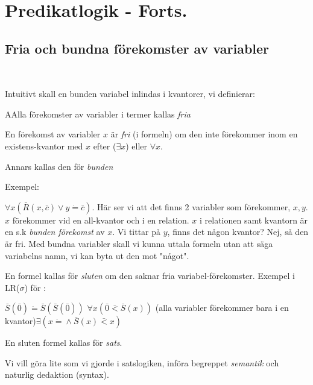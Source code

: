 \section{Predikatlogik - Forts.}
\par\bigskip
\subsection{Fria och bundna förekomster av variabler}\hfill\\
\par\bigskip
\noindent Intuitivt skall en bunden variabel inlindas i kvantorer, vi definierar:
\par\bigskip
\begin{theo}
  AAlla förekomster av variabler i termer kallas \textit{fria}
  \par\bigskip
  \noindent En förekomst av variabler $x$ är \textit{fri} (i formeln) om den inte förekommer inom en existens-kvantor med $x$ efter ($\exists x$) eller $\forall x$.\par
  \noindent Annars kallas den för \textit{bunden}
\end{theo}
\par\bigskip
\noindent Exempel:\par
\noindent $\forall x\left(\bar{R}(x,\bar{c})\vee y\dot{=}\bar{c}\right)$. Här ser vi att det finns 2 variabler som  förekommer, $x,y$. $x$ förekommer vid en all-kvantor och i en relation. $x$ i relationen samt kvantorn är en s.k \textit{bunden förekomst} av $x$. Vi tittar på $y$, finns det någon kvantor? Nej, så den är fri. Med bundna variabler skall vi kunna uttala formeln utan att säga variabelns namn, vi kan byta ut den mot "något".
\par\bigskip
\noindent En formel kallas för \textit{sluten} om den saknar fria variabel-förekomster. Exempel i LR($\sigma$) för :
\par\bigskip $\bar{S}(\bar{0})\dot{=}\bar{S}(\bar{S}(\bar{0}))$ \qquad $\forall x\left(\bar{0}\bar{<}\bar{S}(x)\right)$ (alla variabler förekommer bara i en kvantor)\qquad$\exists\left(x\dot{=}\wedge\bar{S}(x)\bar{<}x\right)$
\par\bigskip
\noindent En sluten formel kallas för \textit{sats}.
\par\bigskip
\noindent Vi vill göra lite som vi gjorde i satslogiken, införa begreppet \textit{semantik} och naturlig dedaktion (syntax).
\par\bigskip
